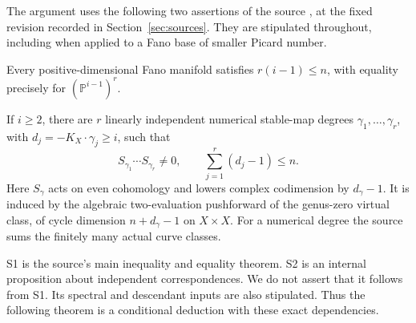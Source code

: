 \documentclass[11pt]{article}
\theoremstyle{definition}\newtheorem{definition}[theorem]{Definition}
\theoremstyle{remark}\newtheorem{remark}[theorem]{Remark}
\newcommand{\PP}{\mathbb P}
\begin{document}
The argument uses the following two assertions of the source
\cite{source}, at the fixed revision recorded in Section~\ref{sec:sources}.
They are stipulated throughout, including when applied to a Fano base of
smaller Picard number.
\begin{description}[leftmargin=2.8em,style=nextline]
\item[S1.] Every positive-dimensional Fano manifold satisfies
$r(i-1)\le n$, with equality precisely for $(\PP^{i-1})^r$.
\item[S2.] If $i\ge2$, there are $r$ linearly independent numerical
stable-map degrees $\gamma_1,\ldots,\gamma_r$, with
$d_j=-K_X\cdot\gamma_j\ge i$, such that
\begin{equation}\label{eq:word}
 S_{\gamma_1}\cdots S_{\gamma_r}\ne0,
 \qquad \sum_{j=1}^r(d_j-1)\le n.
\end{equation}
Here $S_\gamma$ acts on even cohomology and lowers complex codimension by
$d_\gamma-1$. It is induced by the algebraic two-evaluation pushforward of
the genus-zero virtual class, of cycle dimension $n+d_\gamma-1$ on $X\times X$.
For a numerical degree the source sums the finitely many actual curve classes.
\end{description}
S1 is the source's main inequality and equality theorem. S2 is an internal
proposition about independent correspondences. We do not assert that it
follows from S1. Its spectral and descendant inputs are also stipulated. Thus the
following theorem is a conditional deduction with these exact dependencies.
\end{document}
